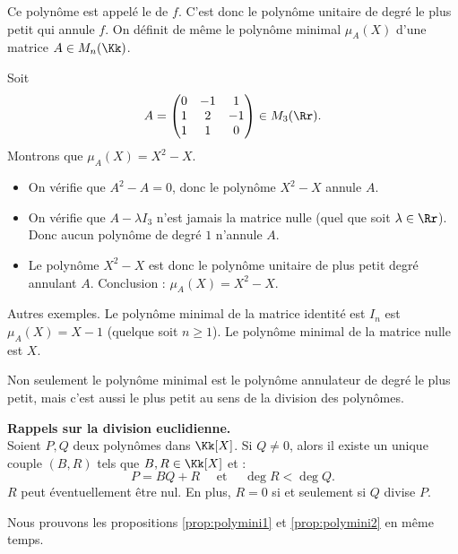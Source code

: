 \documentclass[12pt, class=report,crop=false]{standalone}
\begin{document}
Ce polynôme est appelé le  de $f$.
C'est donc le polynôme unitaire de degré le plus petit qui annule $f$.
On définit de même le polynôme minimal $\mu_A(X)$ d'une matrice $A \in M_n(\Kk)$.


\begin{exemple}
Soit 
\[
A = 
\begin{pmatrix}
0 & -1 & 1 \\
1 & 2 & -1 \\
1 & 1 & 0
\end{pmatrix} \in M_3(\Rr).\]
Montrons que $\mu_A(X) = X^2-X$.
\begin{itemize}	
  \item On vérifie que $A^2-A = 0$, donc le polynôme $X^2-X$ annule $A$.
  
  \item On vérifie que $A-\lambda I_3$ n'est jamais la matrice nulle (quel que soit $\lambda \in \Rr$). Donc aucun polynôme de degré $1$ n’annule $A$.
  
  \item Le polynôme $X^2-X$ est donc le polynôme unitaire de plus petit degré annulant $A$. Conclusion : $\mu_A(X) = X^2-X$.
\end{itemize}
\end{exemple} 

Autres exemples. Le polynôme minimal de la matrice identité est $I_n$ est $\mu_A(X) = X -1$ (quelque soit $n\ge1$). Le polynôme minimal de la matrice nulle est $X$.

\bigskip

Non seulement le polynôme minimal est le polynôme annulateur de degré le plus petit,
mais c'est aussi le plus petit au sens de la division des polynômes.
\begin{proposition}
\label{prop:polymini2}
\sauteligne
{} 
\end{proposition}

\textbf{Rappels sur la division euclidienne.}\\
Soient $P,Q$ deux polynômes dans $\Kk[X]$. Si $Q \neq 0$, alors il existe un unique couple $(B,R)$ tels que $B,R \in \Kk[X]$ et :
\[P=BQ+R \quad \text{ et } \quad \deg R < \deg Q.\]
$R$ peut éventuellement être  nul. En plus, $R=0$ si et seulement si $Q$ divise $P$.


Nous prouvons les propositions \ref{prop:polymini1} et \ref{prop:polymini2} en même temps.
\end{document}
